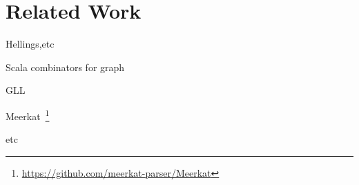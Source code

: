 \section{Related Work}

Hellings,etc

Scala combinators for graph~\cite{ScalaGraphParsing}

GLL

Meerkat~\footnote{\url{https://github.com/meerkat-parser/Meerkat}}~\cite{Meerkat}

etc

